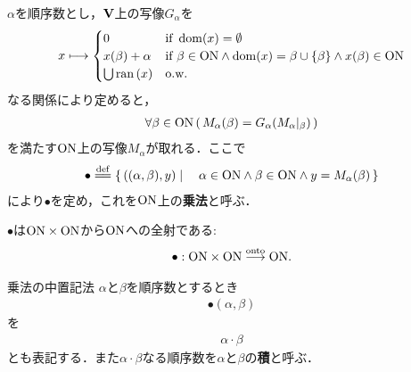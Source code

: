	\begin{screen}
		\begin{dfn}[順序数の乗法]
			$\alpha$を順序数とし，$\mathbf{V}$上の写像$G_\alpha$を
			\begin{align}
				x \longmapsto 
				\begin{cases}
					0 & \mbox{if } \operatorname{dom}(x) = \emptyset \\
					x(\beta) + \alpha & \mbox{if } \beta \in \mathrm{ON} \wedge \operatorname{dom}(x) = \beta \cup \{\beta\} 
					\wedge x(\beta) \in \mathrm{ON} \\
					\bigcup \operatorname*{ran} \left(x\right) & \mbox{o.w.}
				\end{cases}
			\end{align}
			なる関係により定めると，
			\begin{align}
				\forall \beta \in \mathrm{ON}\, (\, M_\alpha(\beta) = G_\alpha(M_\alpha|_\beta)\, )
			\end{align}
			を満たす$\mathrm{ON}$上の写像$M_\alpha$が取れる．ここで
			\begin{align}
				\bullet \defeq \Set{((\alpha,\beta),y)}{\alpha \in \ON \wedge \beta \in \ON \wedge y = M_\alpha (\beta)}
			\end{align}
			により$\bullet$を定め，これを$\mathrm{ON}$上の{\bf 乗法}と呼ぶ．
		\end{dfn}
	\end{screen}
	
	\begin{screen}
		\begin{thm}\label{thm:multiplication_on_ordinal_numbers_is_a_mapping}
			$\bullet$は$\mathrm{ON} \times \mathrm{ON}$から$\mathrm{ON}$への全射である:
			\begin{align}
				\bullet:\mathrm{ON} \times \mathrm{ON} \overset{\mathrm{onto}}{\longrightarrow} \mathrm{ON}.
			\end{align}
		\end{thm}
	\end{screen}
	
	\begin{itembox}[l]{乗法の中置記法}
		$\alpha$と$\beta$を順序数とするとき
		\begin{align}
			\bullet (\alpha,\beta)
		\end{align}
		を
		\begin{align}
			\alpha \cdot \beta
		\end{align}
		とも表記する．また$\alpha \cdot \beta$なる順序数を$\alpha$と$\beta$の{\bf 積}と呼ぶ．
	\end{itembox}
	
